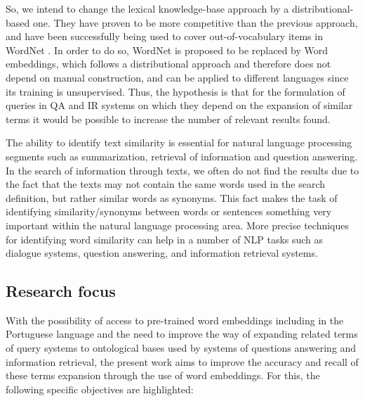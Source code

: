 So, we intend to change the lexical knowledge-base approach by a distributional-based one. They have proven to be more competitive than the previous approach, and have been successfully being used to cover out-of-vocabulary items in WordNet \cite{gonccalo2018distributional, Agirre2009}.
In order to do so, WordNet is proposed to be replaced by Word embeddings, which follows a distributional approach and therefore does not depend on manual construction, and can be applied to different languages since its training is unsupervised. Thus, the hypothesis is that for the formulation of queries in QA and IR systems on which they depend on the expansion of similar terms it would be possible to increase the number of relevant results found.

The ability to identify text similarity is essential for natural language processing segments such as summarization, retrieval of information and question answering. In the search of information through texts, we often do not find the results due to the fact that the texts may not contain the same words used in the search definition, but rather similar words as synonyms. This fact makes the task of identifying similarity/synonyms between words or sentences something very important within the natural language processing area. More precise techniques for identifying word similarity can help in a number of NLP tasks such as dialogue systems, question answering, and information retrieval systems. \cite{gonccalo2018distributional, Pilehvar2013, Agirre2009, Islam2007ApplicationsOC}


\subsection{Research focus}

With the possibility of access to pre-trained word embeddings including in the Portuguese language and the need to improve the way of expanding related terms of query systems to ontological bases used by systems of questions answering and information retrieval, the present work aims to improve the accuracy and recall of these terms expansion through the use of word embeddings. For this, the following specific objectives are highlighted:

